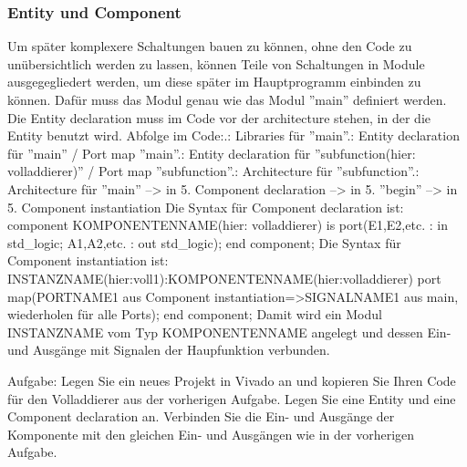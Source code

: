 \documentclass{article}
\begin{document}
\subsubsection{Entity und Component}
Um sp\"ater komplexere Schaltungen bauen zu k\"onnen, ohne den Code zu un\"ubersichtlich werden zu lassen, k\"onnen Teile von Schaltungen in Module ausgegegliedert werden, um diese sp\"ater im Hauptprogramm einbinden zu k\"onnen. Daf\"ur muss das Modul genau wie das Modul ''main'' definiert werden. Die Entity declaration muss im Code vor der architecture stehen, in der die Entity benutzt wird. Abfolge im Code:.: Libraries für ''main''.: Entity declaration für ''main'' / Port map ''main''.: Entity declaration für ''subfunction(hier: volladdierer)'' / Port map ''subfunction''.: Architecture für ''subfunction''.: Architecture für ''main''\newline
--> in 5. Component declaration\newline
--> in 5. ''begin''\newline
--> in 5. Component instantiation\newline
Die Syntax für Component declaration ist:\newline
component KOMPONENTENNAME(hier: volladdierer) is\newline
port(E1,E2,etc. : in std\_logic;\newline
A1,A2,etc. : out std\_logic);\newline
end component;\newline
\newline
Die Syntax für Component instantiation ist:\newline
INSTANZNAME(hier:voll1):KOMPONENTENNAME(hier:volladdierer) \newline
port map(PORTNAME1 aus Component instantiation=>SIGNALNAME1 aus main,\newline 
wiederholen für alle Ports);\newline
end component;\newline
Damit wird ein Modul INSTANZNAME vom Typ KOMPONENTENNAME angelegt und dessen Ein- und Ausg\"ange mit Signalen der Haupfunktion verbunden.\newline

Aufgabe:\newline
Legen Sie ein neues Projekt in Vivado an und kopieren Sie Ihren Code f\"ur den Volladdierer aus der vorherigen Aufgabe. Legen Sie eine Entity und eine Component declaration an. Verbinden Sie die Ein- und Ausg\"ange der Komponente mit den gleichen Ein- und Ausg\"angen wie in der vorherigen Aufgabe. 
\end{document}
